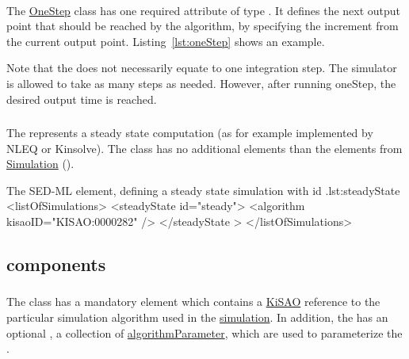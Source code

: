 \paragraph*{}
\label{sec:step}
The \hyperref[class:oneStep]{OneStep} class has one required attribute  of type . It defines the next output point that should be reached by the algorithm, by specifying the increment from the current output point. Listing~\ref{lst:oneStep} shows an example. 

Note that the  does not necessarily equate to one integration step. The simulator is allowed to take as many steps as needed. However, after running oneStep, the desired output time is reached.


\subsubsection{}
\label{class:steadyState}
The  represents a steady state computation (as for example implemented by NLEQ or Kinsolve). The  class has no additional elements than the elements from \hyperref[class:simulation]{Simulation} ().


\begin{myXmlLst}{The SED-ML  element, defining a steady state simulation with id .}{lst:steadyState}
<listOfSimulations>
	<steadyState id="steady"> 
		<algorithm kisaoID="KISAO:0000282" />
	</steadyState > 
</listOfSimulations>
\end{myXmlLst}


\subsection{ components}
\label{class:simulationComponents}

\subsubsection{}
\label{class:algorithm}
The  class has a mandatory element \hyperref[sec:kisaoid]{} which contains a \hyperref[sec:kisao]{KiSAO} reference to the particular simulation algorithm used in the \hyperref[class:simulation]{simulation}. In addition, the  has an optional \hyperref[class:listOfAlgorithmParameters]{}, a collection of \hyperref[class:algorithmParameter]{algorithmParameter}, which are used to parameterize the .

